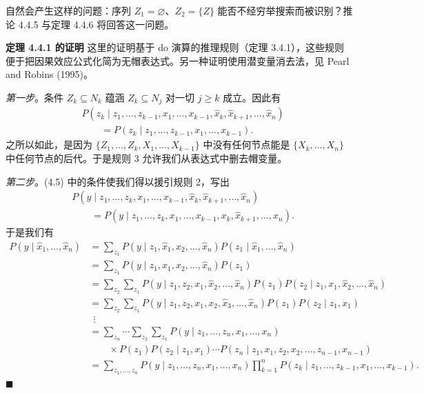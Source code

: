 自然会产生这样的问题：序列 $Z_1=\varnothing$、$Z_2=\{Z\}$ 能否不经穷举搜索而被识别？推论 4.4.5 与定理 4.4.6 将回答这一问题。

\medskip
\noindent\textbf{定理 4.4.1 的证明}\quad
这里的证明基于 do 演算的推理规则（定理 3.4.1），这些规则便于把因果效应公式化简为无帽表达式。另一种证明使用潜变量消去法，见 Pearl and Robins (1995)。

\emph{第一步}。条件 $Z_k\subseteq N_k$ 蕴涵 $Z_k\subseteq N_j$ 对一切 $j\ge k$ 成立。因此有
\begin{equation*}
\begin{aligned}
&P(z_k\mid z_1,\dots,z_{k-1},x_1,\dots,x_{k-1},\hat{x}_k,\hat{x}_{k+1},\dots,\hat{x}_n)\\
&\qquad = P(z_k\mid z_1,\dots,z_{k-1},x_1,\dots,x_{k-1}).
\end{aligned}
\end{equation*}
之所以如此，是因为 $\{Z_1,\dots,Z_k,X_1,\dots,X_{k-1}\}$ 中没有任何节点能是 $\{X_k,\dots,X_n\}$ 中任何节点的后代。于是规则 3 允许我们从表达式中删去帽变量。

\emph{第二步}。\textup{(4.5)} 中的条件使我们得以援引规则 2，写出
\begin{equation*}
\begin{aligned}
&P(y\mid z_1,\dots,z_k,x_1,\dots,x_{k-1},\hat{x}_k,\hat{x}_{k+1},\dots,\hat{x}_n)\\
&\qquad = P(y\mid z_1,\dots,z_k,x_1,\dots,x_{k-1},x_k,\hat{x}_{k+1},\dots,\hat{x}_n).
\end{aligned}
\end{equation*}
于是我们有
\begin{equation*}
\begin{aligned}
P(y\mid\hat{x}_1,\dots,\hat{x}_n)
&= \sum_{z_1}P(y\mid z_1,\hat{x}_1,\hat{x}_2,\dots,\hat{x}_n)P(z_1\mid\hat{x}_1,\dots,\hat{x}_n)\\
&= \sum_{z_1}P(y\mid z_1,x_1,\hat{x}_2,\dots,\hat{x}_n)P(z_1)\\
&= \sum_{z_2}\sum_{z_1}P(y\mid z_1,z_2,x_1,\hat{x}_2,\dots,\hat{x}_n)P(z_1)P(z_2\mid z_1,x_1,\hat{x}_2,\dots,\hat{x}_n)\\
&= \sum_{z_2}\sum_{z_1}P(y\mid z_1,z_2,x_1,x_2,\hat{x}_3,\dots,\hat{x}_n)P(z_1)P(z_2\mid z_1,x_1)\\
&\ \ \vdots\\
&= \sum_{z_n}\cdots\sum_{z_2}\sum_{z_1}P(y\mid z_1,\dots,z_n,x_1,\dots,x_n)\\
&\qquad\times P(z_1)P(z_2\mid z_1,x_1)\cdots P(z_n\mid z_1,x_1,z_2,x_2,\dots,z_{n-1},x_{n-1})\\
&= \sum_{z_1,\dots,z_n}P(y\mid z_1,\dots,z_n,x_1,\dots,x_n)\prod_{k=1}^{n}P(z_k\mid z_1,\dots,z_{k-1},x_1,\dots,x_{k-1}).
\end{aligned}
\end{equation*}
\hfill$\blacksquare$

